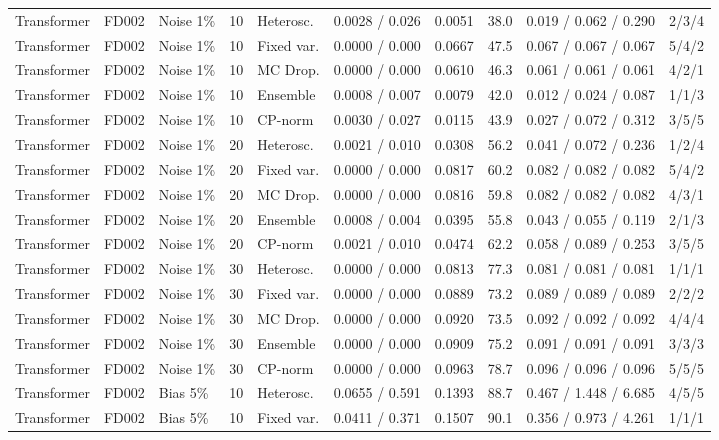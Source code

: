 \documentclass[10pt,a4paper]{article}
\begin{document}
\begin{landscape}
\begin{center}
\begin{longtable}{lllllcclll}
Transformer & FD002 & Noise 1\% & 10 & Heterosc. & 0.0028 / 0.026 & 0.0051 & 38.0 & 0.019 / 0.062 / 0.290 & 2/3/4 \\
Transformer & FD002 & Noise 1\% & 10 & Fixed var. & 0.0000 / 0.000 & 0.0667 & 47.5 & 0.067 / 0.067 / 0.067 & 5/4/2 \\
Transformer & FD002 & Noise 1\% & 10 & MC Drop. & 0.0000 / 0.000 & 0.0610 & 46.3 & 0.061 / 0.061 / 0.061 & 4/2/1 \\
Transformer & FD002 & Noise 1\% & 10 & Ensemble & 0.0008 / 0.007 & 0.0079 & 42.0 & 0.012 / 0.024 / 0.087 & 1/1/3 \\
Transformer & FD002 & Noise 1\% & 10 & CP-norm & 0.0030 / 0.027 & 0.0115 & 43.9 & 0.027 / 0.072 / 0.312 & 3/5/5 \\
Transformer & FD002 & Noise 1\% & 20 & Heterosc. & 0.0021 / 0.010 & 0.0308 & 56.2 & 0.041 / 0.072 / 0.236 & 1/2/4 \\
Transformer & FD002 & Noise 1\% & 20 & Fixed var. & 0.0000 / 0.000 & 0.0817 & 60.2 & 0.082 / 0.082 / 0.082 & 5/4/2 \\
Transformer & FD002 & Noise 1\% & 20 & MC Drop. & 0.0000 / 0.000 & 0.0816 & 59.8 & 0.082 / 0.082 / 0.082 & 4/3/1 \\
Transformer & FD002 & Noise 1\% & 20 & Ensemble & 0.0008 / 0.004 & 0.0395 & 55.8 & 0.043 / 0.055 / 0.119 & 2/1/3 \\
Transformer & FD002 & Noise 1\% & 20 & CP-norm & 0.0021 / 0.010 & 0.0474 & 62.2 & 0.058 / 0.089 / 0.253 & 3/5/5 \\
Transformer & FD002 & Noise 1\% & 30 & Heterosc. & 0.0000 / 0.000 & 0.0813 & 77.3 & 0.081 / 0.081 / 0.081 & 1/1/1 \\
Transformer & FD002 & Noise 1\% & 30 & Fixed var. & 0.0000 / 0.000 & 0.0889 & 73.2 & 0.089 / 0.089 / 0.089 & 2/2/2 \\
Transformer & FD002 & Noise 1\% & 30 & MC Drop. & 0.0000 / 0.000 & 0.0920 & 73.5 & 0.092 / 0.092 / 0.092 & 4/4/4 \\
Transformer & FD002 & Noise 1\% & 30 & Ensemble & 0.0000 / 0.000 & 0.0909 & 75.2 & 0.091 / 0.091 / 0.091 & 3/3/3 \\
Transformer & FD002 & Noise 1\% & 30 & CP-norm & 0.0000 / 0.000 & 0.0963 & 78.7 & 0.096 / 0.096 / 0.096 & 5/5/5 \\
Transformer & FD002 & Bias 5\% & 10 & Heterosc. & 0.0655 / 0.591 & 0.1393 & 88.7 & 0.467 / 1.448 / 6.685 & 4/5/5 \\
Transformer & FD002 & Bias 5\% & 10 & Fixed var. & 0.0411 / 0.371 & 0.1507 & 90.1 & 0.356 / 0.973 / 4.261 & 1/1/1 \\

\end{longtable}
\end{center}
\end{landscape}
\end{document}
